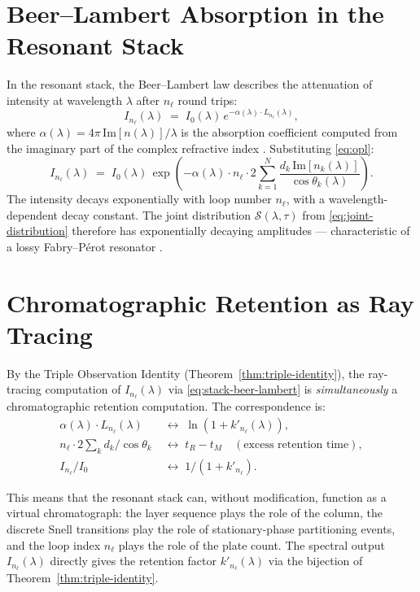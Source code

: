 \documentclass[11pt,twocolumn,a4paper]{article}
\theoremstyle{plain}
\theoremstyle{definition}
\theoremstyle{remark}
\begin{document}
\section{Beer--Lambert Absorption in the Resonant Stack}
\label{sec:beer-lambert}

In the resonant stack, the Beer--Lambert law describes the attenuation of intensity at wavelength $\lambda$ after $n_\ell$ round trips:
\begin{equation}
\label{eq:stack-beer-lambert}
  I_{n_\ell}(\lambda) \;=\; I_0(\lambda)\,e^{-\alpha(\lambda)\cdot L_{n_\ell}(\lambda)},
\end{equation}
where $\alpha(\lambda)=4\pi\,\mathrm{Im}[n(\lambda)]/\lambda$ is the absorption coefficient computed from the imaginary part of the complex refractive index \cite{BornWolf1999}. Substituting \eqref{eq:opl}:
\begin{equation}
  I_{n_\ell}(\lambda) \;=\; I_0(\lambda)\,\exp\!\left(-\alpha(\lambda)\cdot n_\ell\cdot 2\sum_{k=1}^N\frac{d_k\,\mathrm{Im}[n_k(\lambda)]}{\cos\theta_k(\lambda)}\right).
\end{equation}
The intensity decays exponentially with loop number $n_\ell$, with a wavelength-dependent decay constant. The joint distribution $\mathcal{S}(\lambda,\tau)$ from \eqref{eq:joint-distribution} therefore has exponentially decaying amplitudes — characteristic of a lossy Fabry--P\'{e}rot resonator \cite{FabryPerot1899, SalehTeich2007}.

\section{Chromatographic Retention as Ray Tracing}
\label{sec:chromatography}

By the Triple Observation Identity (Theorem~\ref{thm:triple-identity}), the ray-tracing computation of $I_{n_\ell}(\lambda)$ via \eqref{eq:stack-beer-lambert} is \emph{simultaneously} a chromatographic retention computation. The correspondence is:
\begin{align*}
  \alpha(\lambda)\cdot L_{n_\ell}(\lambda) &\;\longleftrightarrow\; \ln(1+k'_{n_\ell}(\lambda)),\\
  n_\ell \cdot 2\sum_k d_k/\cos\theta_k &\;\longleftrightarrow\; t_R - t_M \quad (\text{excess retention time}),\\
  I_{n_\ell}/I_0 &\;\longleftrightarrow\; 1/(1+k'_{n_\ell}).
\end{align*}

This means that the resonant stack can, without modification, function as a virtual chromatograph: the layer sequence plays the role of the column, the discrete Snell transitions play the role of stationary-phase partitioning events, and the loop index $n_\ell$ plays the role of the plate count. The spectral output $I_{n_\ell}(\lambda)$ directly gives the retention factor $k'_{n_\ell}(\lambda)$ via the bijection of Theorem~\ref{thm:triple-identity}.
\end{document}
